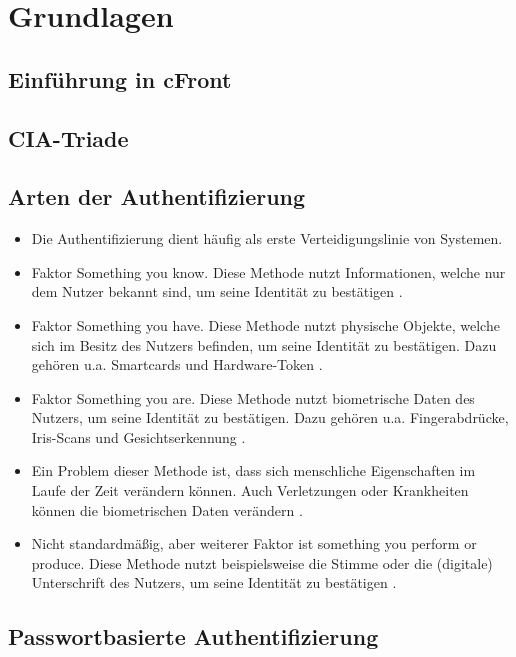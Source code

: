 \chapter{Grundlagen}

\section{Einführung in cFront}

\section{CIA-Triade}

\section{Arten der Authentifizierung}
\begin{itemize}
    \item Die Authentifizierung dient häufig als erste Verteidigungslinie von Systemen. \cite{boonkrong2012security}
    \item Faktor Something you know. Diese Methode nutzt Informationen, welche nur dem Nutzer bekannt sind, um seine Identität zu bestätigen \cite{boonkrong2012security}.
    \item Faktor Something you have. Diese Methode nutzt physische Objekte, welche sich im Besitz des Nutzers befinden, um seine Identität zu bestätigen. Dazu gehören u.a. Smartcards und Hardware-Token \cite{boonkrong2012security}.
    \item Faktor Something you are. Diese Methode nutzt biometrische Daten des Nutzers, um seine Identität zu bestätigen. Dazu gehören u.a. Fingerabdrücke, Iris-Scans und Gesichtserkennung \cite{boonkrong2012security}.
    \item Ein Problem dieser Methode ist, dass sich menschliche Eigenschaften im Laufe der Zeit verändern können. Auch Verletzungen oder Krankheiten können die biometrischen Daten verändern \cite{boonkrong2012security}.
    \item Nicht standardmäßig, aber weiterer Faktor ist something you perform or produce. Diese Methode nutzt beispielsweise die Stimme oder die (digitale) Unterschrift des Nutzers, um seine Identität zu bestätigen \cite{boonkrong2012security}.
\end{itemize}


\section{Passwortbasierte Authentifizierung}

